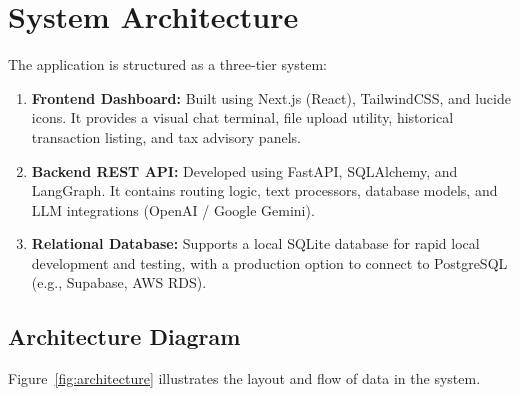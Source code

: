 \documentclass[11pt,a4paper]{article}
\begin{document}
\section{System Architecture}
The application is structured as a three-tier system:
\begin{enumerate}
    \item \textbf{Frontend Dashboard:} Built using Next.js (React), TailwindCSS, and lucide icons. It provides a visual chat terminal, file upload utility, historical transaction listing, and tax advisory panels.
    \item \textbf{Backend REST API:} Developed using FastAPI, SQLAlchemy, and LangGraph. It contains routing logic, text processors, database models, and LLM integrations (OpenAI / Google Gemini).
    \item \textbf{Relational Database:} Supports a local SQLite database for rapid local development and testing, with a production option to connect to PostgreSQL (e.g., Supabase, AWS RDS).
\end{enumerate}

\subsection{Architecture Diagram}
Figure~\ref{fig:architecture} illustrates the layout and flow of data in the system.
\end{document}
